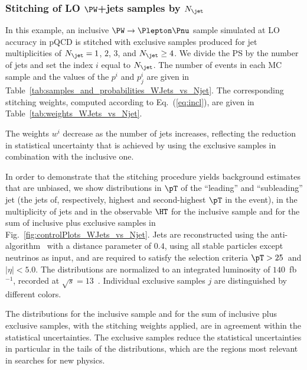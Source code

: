 \subsubsection{Stitching of LO $\PW$+jets samples by $N_{\jet}$}
\label{sec:WJets_vs_Njet}

In this example, an inclusive $\PW \to \Plepton\Pnu$ sample simulated at LO accuracy in pQCD 
is stitched with exclusive samples produced for jet multiplicities of $N_{\jet} = 1$, $2$, $3$, and $N_{\jet} \geq 4$.
We divide the PS by the number of jets and set the index $i$ equal to $N_{\jet}$.
The number of events in each MC sample and the values of the $p^{i}$ and $p_{j}^{i}$ are given in Table~\ref{tab:samples_and_probabilities_WJets_vs_Njet}.
The corresponding stitching weights, computed according to Eq.~(\ref{eq:incl}), are given in Table~\ref{tab:weights_WJets_vs_Njet}.

The weights $w^{i}$ decrease as the number of jets increases, 
reflecting the reduction in statistical uncertainty that is achieved by using the exclusive samples in combination with the inclusive one.

In order to demonstrate that the stitching procedure yields background estimates that are unbiased,
we show distributions in $\pT$ of the ``leading'' and ``subleading'' jet (the jets of, respectively, highest and second-highest $\pT$ in the event),
in the multiplicity of jets and in the observable $\HT$ 
for the inclusive sample and for the sum of inclusive plus exclusive samples in Fig.~\ref{fig:controlPlots_WJets_vs_Njet}.
Jets are reconstructed using the anti-\kt algorithm~\cite{Cacciari:2008gp,Cacciari:2011ma} with a distance parameter of $0.4$,
using all stable particles except neutrinos as input, and are required to satisfy the selection criteria $\pT > 25$~\GeV and $\vert\eta\vert < 5.0$.
The distributions are normalized to an integrated luminosity of $140$~fb$^{-1}$, recorded at $\sqrt{s}=13$~\TeV.
Individual exclusive samples $j$ are distinguished by different colors.


The distributions for the inclusive sample and for the sum of inclusive plus exclusive samples, with the stitching weights applied, are in agreement within the statistical uncertainties.
The exclusive samples reduce the statistical uncertainties in particular in the tails of the distributions,
which are the regions most relevant in searches for new physics.


